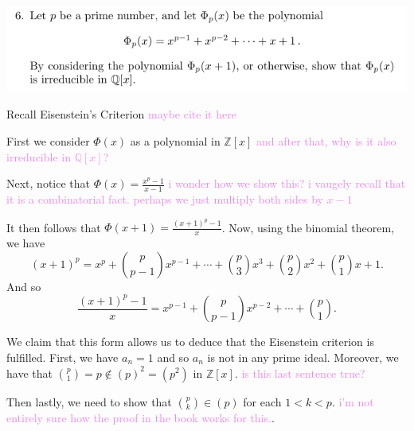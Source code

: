 \documentclass[12pt,letterpaper,boxed]{hmcpset}
\newcommand{\wg}[1]{\textcolor{violet}{#1}}
\newcommand{\Q}{\mathbb Q}
\newcommand{\Z}{\mathbb Z}
\begin{document}
\newpage

\begin{problem}
	\includegraphics[scale=0.8]{6.png}
	\hfill
\end{problem}

\begin{solution}
Recall Eisenstein's Criterion \wg{maybe cite it here}

First we consider $\Phi(x)$ as a polynomial in $\Z[x]$
\wg{and after that, why is it also irreducible in $\Q[x]$?}

Next, notice that $\Phi(x) = \frac{x^p-1}{x-1}$ \wg{i wonder how
we show this? i vaugely recall that it is a combinatorial fact.
perhaps we just multiply both sides by $x-1$}

It then follows that $\Phi(x+1) = \frac{(x+1)^p - 1}{x}$. Now, using
the binomial theorem, we have \[
(x+1)^p = x^p + \binom{p}{p-1}x^{p-1} + \cdots + \binom{p}{3}x^3 +
\binom{p}{2}x^2 + \binom{p}{1} x + 1.
\]
And so \[
	\frac{(x+1)^p - 1}{x}
	= x^{p-1} + \binom{p}{p-1} x^{p-2} + \cdots + \binom{p}{1}.
\]

We claim that this form allows us to deduce that the Eisenstein
criterion is fulfilled.
First, we have $a_n = 1$ and so $a_n$ is not in any prime ideal.
Moreover, we have that $\binom{p}{1} = p \not\in (p)^2 = (p^2)$ in
$\Z[x]$. \wg{is this last sentence true?}

Then lastly, we need to show that $\binom{p}{k} \in (p)$ for each $1 <
k < p$. \wg{i'm not entirely sure how the proof in the book works for
this.}. 
\end{solution}

\newpage

\end{document}
